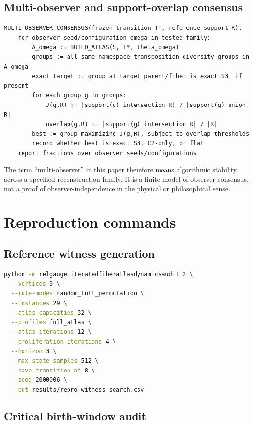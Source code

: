 \documentclass[11pt]{article}
\begin{document}
\subsection{Multi-observer and support-overlap consensus}
\begin{lstlisting}
MULTI_OBSERVER_CONSENSUS(frozen transition T*, reference support R):
    for observer seed/configuration omega in tested family:
        A_omega := BUILD_ATLAS(S, T*, theta_omega)
        groups := all same-namespace transposition-diversity groups in A_omega
        exact_target := group at target parent/fiber is exact S3, if present
        for each group g in groups:
            J(g,R) := |support(g) intersection R| / |support(g) union R|
            overlap(g,R) := |support(g) intersection R| / |R|
        best := group maximizing J(g,R), subject to overlap thresholds
        record whether best is exact S3, C2-only, or flat
    report fractions over observer seeds/configurations
\end{lstlisting}

The term ``multi-observer'' in this paper therefore means algorithmic stability across a specified reconstruction family.  It is a finite model of observer consensus, not a proof of observer-independence in the physical or philosophical sense.

\section{Reproduction commands}

\subsection{Reference witness generation}

\begin{lstlisting}[language=bash]
python -m relgauge.iteratedfiberatlasdynamicsaudit 2 \
  --vertices 9 \
  --rule-modes random_full_permutation \
  --instances 29 \
  --atlas-capacities 32 \
  --profiles full_atlas \
  --atlas-iterations 12 \
  --proliferation-iterations 4 \
  --horizon 3 \
  --max-state-samples 512 \
  --save-transition-at 8 \
  --seed 2000006 \
  --out results/repro_witness_search.csv
\end{lstlisting}

\subsection{Critical birth-window audit}
\end{document}
